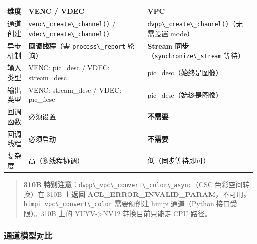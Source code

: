 \begin{longtable}[]{@{}
  >{\raggedright\arraybackslash}p{}
  >{\raggedright\arraybackslash}p{}
  >{\raggedright\arraybackslash}p{}@{}}
\toprule\noalign{}
\begin{minipage}[b]{\linewidth}\raggedright
维度
\end{minipage} & \begin{minipage}[b]{\linewidth}\raggedright
VENC / VDEC
\end{minipage} & \begin{minipage}[b]{\linewidth}\raggedright
VPC
\end{minipage} \\
\midrule\noalign{}
\endhead
\bottomrule\noalign{}
\endlastfoot
通道创建 & \passthrough{\lstinline!venc\_create\_channel()!} /
\passthrough{\lstinline!vdec\_create\_channel()!} &
\passthrough{\lstinline!dvpp\_create\_channel()!}（无需设置 mode） \\
异步机制 & \textbf{回调线程}（需
\passthrough{\lstinline!process\_report!} 轮询） & \textbf{Stream
同步}（\passthrough{\lstinline!synchronize\_stream!} 等待） \\
输入类型 & VENC: pic\_desc / VDEC: stream\_desc &
pic\_desc（始终是图像） \\
输出类型 & VENC: stream\_desc / VDEC: pic\_desc &
pic\_desc（始终是图像） \\
回调函数 & 必须设置 & \textbf{不需要} \\
回调线程 & 必须启动 & \textbf{不需要} \\
复杂度 & 高（多线程协调） & 低（同步等待即可） \\
\end{longtable}

\begin{quote}
\textbf{310B
特别注意}：\passthrough{\lstinline!dvpp\_vpc\_convert\_color\_async!}（CSC
色彩空间转换）在 310B 上\textbf{返回
ACL\_ERROR\_INVALID\_PARAM}，不可用。\passthrough{\lstinline!himpi.vpc\_convert\_color!}
需要预创建 himpi 通道（Python 接口受限）。310B 上的
YUYV-\textgreater NV12 转换目前只能走 CPU 路径。
\end{quote}

\subsubsection{通道模型对比}\label{src-book-chapter6-h88}

